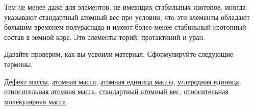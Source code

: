 Тем не менее даже для элементов, не имеющих стабильных изотопов, иногда указывают стандартный атомный вес при условии, что эти элементы обладают больш\'{и}м временем полураспада и имеют более-менее стабильный изотопный состав в земной коре. Это элементы торий, протактиний и уран.

Давайте проверим, как вы усвоили материал. Сформулируйте следующие термины.

\begin{termlist}
    \hyperref[term:mass_defect]{Дефект массы},
    \hyperref[term:atomic_mass]{атомная масса},
    \hyperref[term:atomic_mass_constant]{атомная единица массы},
    \hyperref[term:carbon_unit]{углеродная единица},
    \hyperref[term:relative_atomic_mass]{относительная атомная масса},
    \hyperref[term:standard_atomic_weight]{стандартный атомный вес},
    \hyperref[term:molecular_mass]{относительная молекулярная масса}.
\end{termlist}

